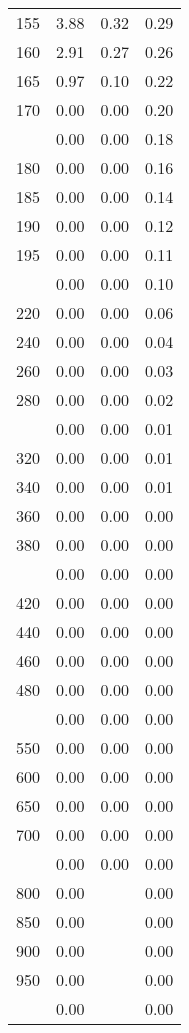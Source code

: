\begin{table}[ht]
\begin{tabular}{lccc}
  155 & 3.88 & 0.32 & 0.29 \\ 
  160 & 2.91 & 0.27 & 0.26 \\ 
  165 & 0.97 & 0.10 & 0.22 \\ 
  170 & 0.00 & 0.00 & 0.20 \\ 
   \addlinespace
175 & 0.00 & 0.00 & 0.18 \\ 
  180 & 0.00 & 0.00 & 0.16 \\ 
  185 & 0.00 & 0.00 & 0.14 \\ 
  190 & 0.00 & 0.00 & 0.12 \\ 
  195 & 0.00 & 0.00 & 0.11 \\ 
   \addlinespace
200 & 0.00 & 0.00 & 0.10 \\ 
  220 & 0.00 & 0.00 & 0.06 \\ 
  240 & 0.00 & 0.00 & 0.04 \\ 
  260 & 0.00 & 0.00 & 0.03 \\ 
  280 & 0.00 & 0.00 & 0.02 \\ 
   \addlinespace
300 & 0.00 & 0.00 & 0.01 \\ 
  320 & 0.00 & 0.00 & 0.01 \\ 
  340 & 0.00 & 0.00 & 0.01 \\ 
  360 & 0.00 & 0.00 & 0.00 \\ 
  380 & 0.00 & 0.00 & 0.00 \\ 
   \addlinespace
400 & 0.00 & 0.00 & 0.00 \\ 
  420 & 0.00 & 0.00 & 0.00 \\ 
  440 & 0.00 & 0.00 & 0.00 \\ 
  460 & 0.00 & 0.00 & 0.00 \\ 
  480 & 0.00 & 0.00 & 0.00 \\ 
   \addlinespace
500 & 0.00 & 0.00 & 0.00 \\ 
  550 & 0.00 & 0.00 & 0.00 \\ 
  600 & 0.00 & 0.00 & 0.00 \\ 
  650 & 0.00 & 0.00 & 0.00 \\ 
  700 & 0.00 & 0.00 & 0.00 \\ 
   \addlinespace
750 & 0.00 & 0.00 & 0.00 \\ 
  800 & 0.00 &  & 0.00 \\ 
  850 & 0.00 &  & 0.00 \\ 
  900 & 0.00 &  & 0.00 \\ 
  950 & 0.00 &  & 0.00 \\ 
   \addlinespace
1000 & 0.00 &  & 0.00 \\ 
   \bottomrule
\end{tabular}
\end{table}
